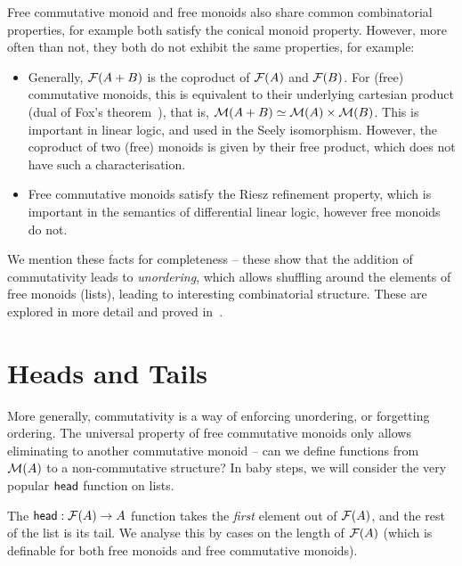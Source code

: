 Free commutative monoid and free monoids also share common combinatorial properties, for example both satisfy the
conical monoid property.
%
However, more often than not, they both do not exhibit the same properties, for example:
\begin{itemize}
    \item
        Generally, $\mathcal{F}(A + B)$ is the coproduct of $\mathcal{F}(A)$ and $\mathcal{F}(B)$.
        For (free) commutative monoids, this is equivalent to
        their underlying cartesian product
          (dual of Fox's theorem~\cite{foxCoalgebrasCartesianCategories1976}),
          that is, $\mathcal{M}(A + B) \mathrel{\simeq} \mathcal{M}(A) \times \mathcal{M}(B)$.
          This is important in linear logic, and used in the Seely isomorphism.
          However, the coproduct of two (free) monoids is given by their free product,
          which does not have such a characterisation.
    \item Free commutative monoids satisfy the Riesz refinement property,
          which is important in the semantics of differential linear logic,
          however free monoids do not.
\end{itemize}
We mention these facts for completeness -- these show that the addition of commutativity leads to \emph{unordering},
which allows shuffling around the elements of free monoids (lists), leading to interesting combinatorial structure.
%
These are explored in more detail and proved in~\cite{choudhuryFreeCommutativeMonoids2023}.

\section{Heads and Tails}\label{sec:head}

More generally, commutativity is a way of enforcing unordering, or forgetting ordering.
%
The universal property of free commutative monoids only allows eliminating to another commutative monoid --
can we define functions from $\mathcal{M}(A)$ to a non-commutative structure?
%
In baby steps, we will consider the very popular $\operatorname{\mathsf{head}}$ function on lists.

The $\operatorname{\mathsf{head}} : \mathcal{F}(A) \to A$ function takes the \emph{first} element out of $\mathcal{F}(A)$, and the rest of the list is
its tail.
%
We analyse this by cases on the length of $\mathcal{F}(A)$
(which is definable for both free monoids and free commutative monoids).

